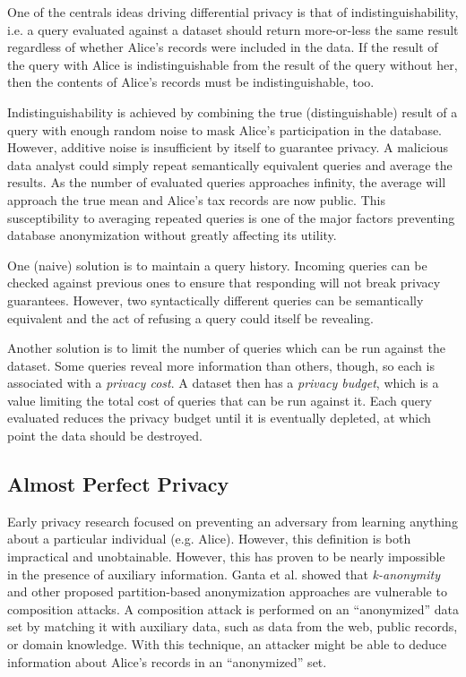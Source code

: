 \documentclass[12pt]{report}
\begin{document}
One of the centrals ideas driving differential privacy is that of indistinguishability, i.e. a query evaluated against a dataset should return more-or-less the same result regardless of whether Alice's records were included in the data.
If the result of the query with Alice is indistinguishable from the result of the query without her, then the contents of Alice's records must be indistinguishable, too.

Indistinguishability is achieved by combining the true (distinguishable) result of a query with enough random noise to mask Alice's participation in the database.
However, additive noise is insufficient by itself to guarantee privacy.
A malicious data analyst could simply repeat semantically equivalent queries and average the results.
As the number of evaluated queries approaches infinity, the average will approach the true mean and Alice's tax records are now public.
This susceptibility to averaging repeated queries is one of the major factors preventing database anonymization without greatly affecting its utility.

One (naive) solution is to maintain a query history.
Incoming queries can be checked against previous ones to ensure that responding will not break privacy guarantees.
However, two syntactically different queries can be semantically equivalent and the act of refusing a query could itself be revealing.

Another solution is to limit the number of queries which can be run against the dataset.
Some queries reveal more information than others, though, so each is associated with a \textit{privacy cost}.
A dataset then has a \textit{privacy budget}, which is a value limiting the total cost of queries that can be run against it.
Each query evaluated reduces the privacy budget until it is eventually depleted, at which point the data should be destroyed.

\subsection{Almost Perfect Privacy}\label{subsec:intro-almostperfectpriv}

Early privacy research focused on preventing an adversary from learning anything about a particular individual (e.g. Alice).
However, this definition is both impractical and unobtainable.
However, this has proven to be nearly impossible in the presence of auxiliary information.
Ganta et al. showed that \textit{k-anonymity} and other proposed partition-based anonymization approaches are vulnerable to composition attacks\cite{ganta2008composition}.
A composition attack is performed on an ``anonymized'' data set by matching it with auxiliary data, such as data from the web, public records, or domain knowledge.
With this technique, an attacker might be able to deduce information about Alice's records in an ``anonymized'' set.
\end{document}
